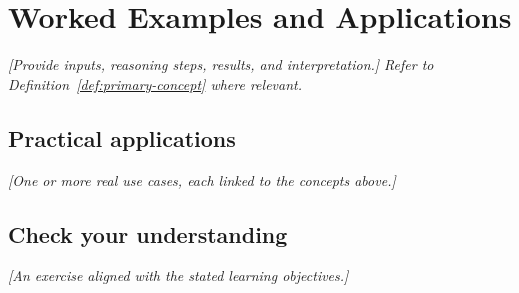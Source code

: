\section{Worked Examples and Applications}
\label{sec:examples}

\begin{example}
\emph{[Provide inputs, reasoning steps, results, and interpretation.]
Refer to Definition~\ref{def:primary-concept} where relevant.}
\end{example}

\subsection{Practical applications}
\emph{[One or more real use cases, each linked to the concepts above.]}

\subsection{Check your understanding}
\emph{[An exercise aligned with the stated learning objectives.]}
